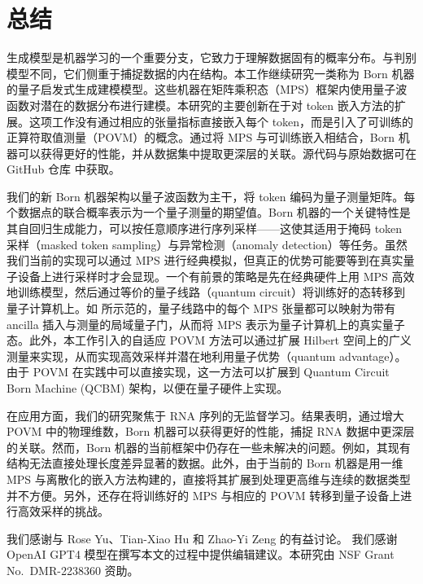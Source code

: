 \section{总结}

生成模型是机器学习的一个重要分支，它致力于理解数据固有的概率分布。与判别模型不同，它们侧重于捕捉数据的内在结构。本工作继续研究一类称为 Born 机器的量子启发式生成建模模型。这些机器在矩阵乘积态（MPS）框架内使用量子波函数对潜在的数据分布进行建模。本研究的主要创新在于对 token 嵌入方法的扩展。这项工作没有通过相应的张量指标直接嵌入每个 token，而是引入了可训练的正算符取值测量（POVM）的概念。通过将 MPS 与可训练嵌入相结合，Born 机器可以获得更好的性能，并从数据集中提取更深层的关联。源代码与原始数据可在 GitHub 仓库\cite{hou2023github} 中获取。

我们的新 Born 机器架构以量子波函数为主干，将 token 编码为量子测量矩阵。每个数据点的联合概率表示为一个量子测量的期望值。Born 机器的一个关键特性是其自回归生成能力，可以按任意顺序进行序列采样——这使其适用于掩码 token 采样（masked token sampling）与异常检测（anomaly detection）等任务。虽然我们当前的实现可以通过 MPS 进行经典模拟，但真正的优势可能要等到在真实量子设备上进行采样时才会显现。一个有前景的策略是先在经典硬件上用 MPS 高效地训练模型，然后通过等价的量子线路（quantum circuit）将训练好的态转移到量子计算机上。如 \cite{2022PhRvX..12a1047H, 2024QS&T....9a5012R} 所示范的，量子线路中的每个 MPS 张量都可以映射为带有 ancilla 插入与测量的局域量子门，从而将 MPS 表示为量子计算机上的真实量子态。此外，本工作引入的自适应 POVM 方法可以通过扩展 Hilbert 空间上的广义测量来实现\cite{preskill1998lecture}，从而实现高效采样并潜在地利用量子优势（quantum advantage）。由于 POVM 在实践中可以直接实现，这一方法可以扩展到 Quantum Circuit Born Machine (QCBM) 架构，以便在量子硬件上实现\cite{PhysRevA.98.062324, 2019npjQI...5...45B}。

在应用方面，我们的研究聚焦于 RNA 序列的无监督学习。结果表明，通过增大 POVM 中的物理维数，Born 机器可以获得更好的性能，捕捉 RNA 数据中更深层的关联。然而，Born 机器的当前框架中仍存在一些未解决的问题。例如，其现有结构无法直接处理长度差异显著的数据。此外，由于当前的 Born 机器是用一维 MPS 与离散化的嵌入方法构建的，直接将其扩展到处理更高维与连续的数据类型并不方便。另外，还存在将训练好的 MPS 与相应的 POVM 转移到量子设备上进行高效采样的挑战。

\begin{acknowledgments}
我们感谢与 Rose Yu、Tian-Xiao Hu 和 Zhao-Yi Zeng 的有益讨论。
我们感谢 OpenAI GPT4 模型在撰写本文的过程中提供编辑建议。本研究由 NSF Grant No.~DMR-2238360 资助。
\end{acknowledgments}


